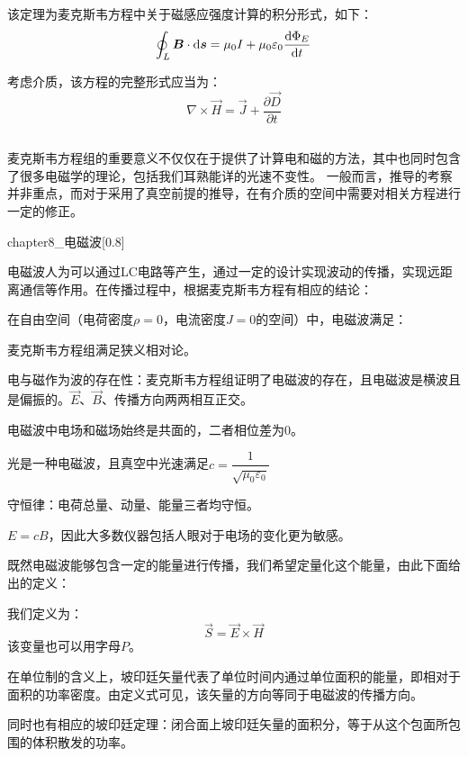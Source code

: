 \begin{law}
    该定理为麦克斯韦方程中关于磁感应强度计算的积分形式，如下：
    \[\oint_L \vec{B}\cdot\dif{\vec{s}}=\mu_0 I+\mu_0\varepsilon_0\dfrac{\dif{\Phi_E}}{\dif{t}}\]

    考虑介质，该方程的完整形式应当为：
    \[\nabla\times \vec{H} = \vec{J}+\dfrac{\partial{\vec{D}}}{\partial{t}}\]
\end{law}
\subsection[电磁波的性质]{}
麦克斯韦方程组的重要意义不仅仅在于提供了计算电和磁的方法，其中也同时包含了很多电磁学的理论，包括我们耳熟能详的光速不变性。
一般而言，推导的考察并非重点，而对于采用了真空前提的推导，在有介质的空间中需要对相关方程进行一定的修正。
\begin{singlefigure}[电磁波]{chapter8_电磁波}[0.8]
\end{singlefigure}

电磁波人为可以通过LC电路等产生，通过一定的设计实现波动的传播，实现远距离通信等作用。在传播过程中，根据麦克斯韦方程有相应的结论：
\begin{law}
    在自由空间（电荷密度$\rho = 0$，电流密度$J = 0$的空间）中，电磁波满足：
    \begin{Itemize}
        \item 麦克斯韦方程组满足狭义相对论。
        \item 电与磁作为波的存在性：麦克斯韦方程组证明了电磁波的存在，且电磁波是横波且是偏振的。$\vec{E}$、$\vec{B}$、传播方向两两相互正交。
        \item 电磁波中电场和磁场始终是共面的，二者相位差为0。
        \item 光是一种电磁波，且真空中光速满足$c=\dfrac{1}{\sqrt{\mu_0\varepsilon_0}}$
        \item 守恒律：电荷总量、动量、能量三者均守恒。
        \item $E = cB$，因此大多数仪器包括人眼对于电场的变化更为敏感。
    \end{Itemize}
\end{law}

既然电磁波能够包含一定的能量进行传播，我们希望定量化这个能量，由此下面给出的定义：
\begin{law}
    我们定义为：
    \[\vec{S} = \vec{E}\times\vec{H}\]
    该变量也可以用字母$P$。
    
    在单位制的含义上，坡印廷矢量代表了单位时间内通过单位面积的能量，即相对于面积的功率密度。由定义式可见，该矢量的方向等同于电磁波的传播方向。

    同时也有相应的坡印廷定理：闭合面上坡印廷矢量的面积分，等于从这个包面所包围的体积散发的功率。
\end{law}

